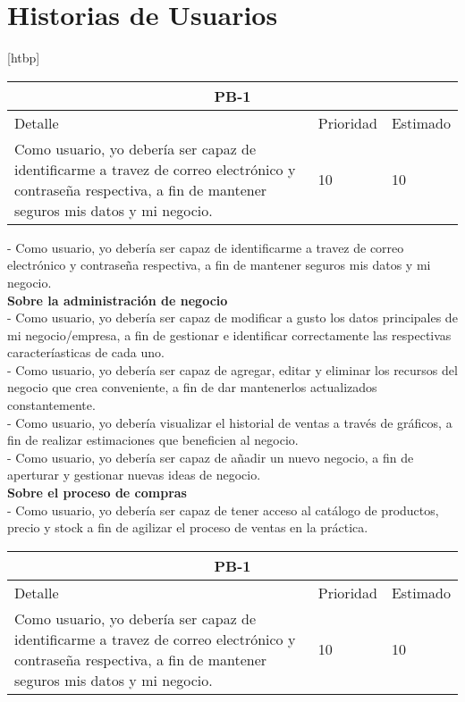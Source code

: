 
\chapter{Historias de Usuarios}[htbp]
\begin{table}
\begin{center}
\begin{tabular}{|p{10cm} | p{2cm} | p{2cm}|}
	\hline
	\multicolumn{3}{|c|}{PB-1}\\
	\hline
	Detalle & Prioridad & Estimado \\
	\hline
	Como usuario, yo debería ser capaz de identificarme a travez de correo electrónico y contraseña respectiva, a fin de mantener seguros mis datos y mi negocio.  & 10 & 10 \\
	\hline	
\end{tabular}
\end{center}
\end{table}
- Como usuario, yo debería ser capaz de identificarme a travez de correo electrónico y contraseña respectiva, a fin de mantener seguros mis datos y mi negocio.\\
\textbf{Sobre la administración de negocio}\\
- Como usuario, yo debería ser capaz de modificar a gusto los datos principales de mi negocio/empresa, a fin de gestionar e identificar correctamente las respectivas caracteríasticas de cada uno.\\
- Como usuario, yo debería ser capaz de agregar, editar y eliminar los recursos del negocio que crea conveniente, a fin de dar mantenerlos actualizados constantemente.\\
- Como usuario, yo debería visualizar el historial de ventas a través de gráficos, a fin de realizar estimaciones que beneficien al negocio.\\
- Como usuario, yo debería ser capaz de añadir un nuevo negocio, a fin de aperturar y gestionar nuevas ideas de negocio.\\
\textbf{Sobre el proceso de compras}\\
- Como usuario, yo debería ser capaz de tener acceso al catálogo de productos, precio y stock a fin de agilizar el proceso de ventas en la práctica. 

\begin{table}
	\begin{center}
		\begin{tabular}{|p{10cm} | p{2cm} | p{2cm}|}
			\hline
			\multicolumn{3}{|c|}{PB-1}\\
			\hline
			Detalle & Prioridad & Estimado \\
			\hline
			Como usuario, yo debería ser capaz de identificarme a travez de correo electrónico y contraseña respectiva, a fin de mantener seguros mis datos y mi negocio.  & 10 & 10 \\
			\hline	
		\end{tabular}
	\end{center}
\end{table}
